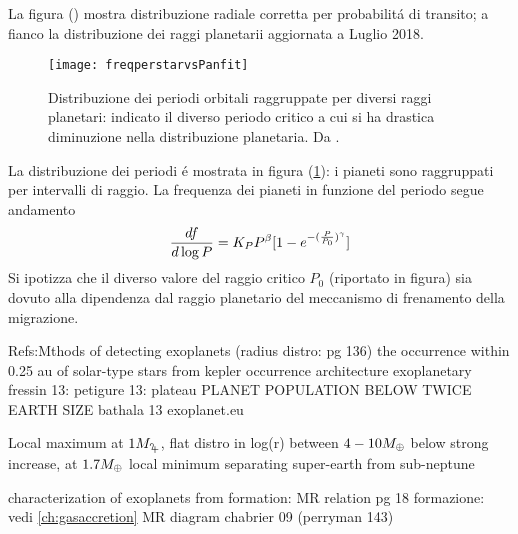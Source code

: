 La figura () mostra distribuzione radiale corretta per probabilit\'a di transito; a fianco la distribuzione dei raggi planetarii aggiornata a Luglio 2018. 

\begin{figure}[!ht]
	\centering
	\texttt{[image: freqperstarvsPanfit]}
	\caption{Distribuzione dei periodi orbitali raggruppate per diversi raggi planetari: indicato il diverso periodo critico a cui si ha drastica diminuzione nella distribuzione planetaria. Da \cite{howard2012planet}.}\label{fig:freqperstarvsPanfit}

\end{figure}

La distribuzione dei periodi \'e mostrata in figura (\ref{fig:freqperstarvsPanfit}): i pianeti sono raggruppati per intervalli di raggio. La frequenza dei pianeti in funzione del periodo segue andamento
\begin{equation}
\TDy{\log{P}}{f}=K_PP\expy{\beta}[1-\exp{-(\frac{P}{P_0})\expy{\gamma}}]
\end{equation}
Si ipotizza che il diverso valore del raggio critico $P_0$ (riportato in figura) sia dovuto alla dipendenza dal raggio planetario del meccanismo di frenamento della migrazione.

\begin{workout}
Refs:Mthods of detecting exoplanets (radius distro: pg 136)
the occurrence within 0.25 au of solar-type stars from kepler
occurrence architecture exoplanetary
fressin 13: 
petigure 13: plateau PLANET POPULATION BELOW TWICE EARTH SIZE
bathala 13
exoplanet.eu
\end{workout}

\begin{workout}
Local maximum at $1\mjupiter{}$, flat distro in log(r) between $4-10\mearth{}$ below strong increase, at $1.7\mearth{}$ local minimum separating super-earth from sub-neptune
\end{workout}

\begin{workout}
characterization of exoplanets from formation: MR relation pg 18
formazione: vedi \ref{ch:gasaccretion}
MR diagram chabrier 09 (perryman 143)
\end{workout}

